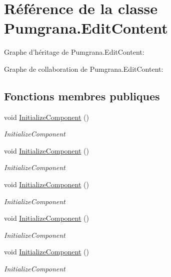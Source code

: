 \hypertarget{class_pumgrana_1_1_edit_content}{\section{Référence de la classe Pumgrana.\+Edit\+Content}
\label{class_pumgrana_1_1_edit_content}
}


Graphe d'héritage de Pumgrana.\+Edit\+Content\+:


Graphe de collaboration de Pumgrana.\+Edit\+Content\+:
\subsection*{Fonctions membres publiques}
\begin{DoxyCompactItemize}
\item 
void \hyperlink{class_pumgrana_1_1_edit_content_ab92d3ab67131ef0dbdf3f96130bb44a8}{Initialize\+Component} ()
\begin{DoxyCompactList}\small\item\em Initialize\+Component \end{DoxyCompactList}\item 
void \hyperlink{class_pumgrana_1_1_edit_content_ab92d3ab67131ef0dbdf3f96130bb44a8}{Initialize\+Component} ()
\begin{DoxyCompactList}\small\item\em Initialize\+Component \end{DoxyCompactList}\item 
void \hyperlink{class_pumgrana_1_1_edit_content_ab92d3ab67131ef0dbdf3f96130bb44a8}{Initialize\+Component} ()
\begin{DoxyCompactList}\small\item\em Initialize\+Component \end{DoxyCompactList}\item 
void \hyperlink{class_pumgrana_1_1_edit_content_ab92d3ab67131ef0dbdf3f96130bb44a8}{Initialize\+Component} ()
\begin{DoxyCompactList}\small\item\em Initialize\+Component \end{DoxyCompactList}\item 
void \hyperlink{class_pumgrana_1_1_edit_content_ab92d3ab67131ef0dbdf3f96130bb44a8}{Initialize\+Component} ()
\begin{DoxyCompactList}\small\item\em Initialize\+Component \end{DoxyCompactList}\item 

\end{DoxyCompactItemize}
